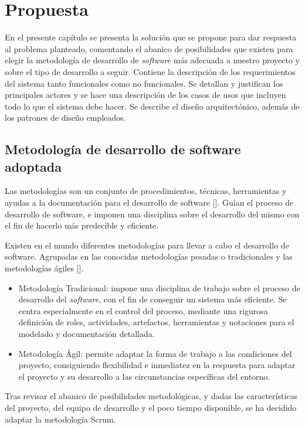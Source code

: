 \chapter{Propuesta}\label{chapter:proposal}

En el presente capítulo se presenta la solución que se propone para dar respuesta al problema planteado, comentando el abanico de posibilidades que existen para elegir la metodología de desarrollo de \textit{software} más adecuada a nuestro proyecto y sobre el tipo de desarrollo a seguir. Contiene la descripción de los requerimientos del sistema tanto funcionales como no funcionales. Se detallan y justifican los principales actores y se hace una descripción de los casos de usos que incluyen todo lo que el sistema debe hacer. Se describe el diseño arquitectónico, además de los patrones de diseño empleados.

\section{Metodología de desarrollo de software adoptada}
Las metodologías son un conjunto de procedimientos, técnicas, herramientas y ayudas a la documentación para el desarrollo de software [\cite{91}]. Guían el proceso de desarrollo de software, e imponen una disciplina sobre el desarrollo del mismo con el fin de hacerlo más predecible y eficiente.

Existen en el mundo diferentes metodologías para llevar a cabo el desarrollo de software. Agrupadas en las conocidas metodologías pesadas o tradicionales y las metodologías ágiles [\cite{92}].

\begin{itemize}
	\item Metodología Tradicional: impone una disciplina de trabajo sobre el proceso de desarrollo del \textit{software}, con el fin de conseguir un sistema más eficiente. Se centra especialmente en el control del proceso, mediante una rigurosa definición de roles, actividades, artefactos, herramientas y notaciones para el modelado y documentación detallada.
	\item Metodología Ágil: permite adaptar la forma de trabajo a las condiciones del proyecto, consiguiendo flexibilidad e inmediatez en la respuesta para adaptar el proyecto y su desarrollo a las circunstancias específicas del entorno.
\end{itemize}


Tras revisar el abanico de posibilidades metodológicas, y dadas las características del proyecto, del equipo de desarrollo y el poco tiempo disponible, se ha decidido adaptar la metodología Scrum.

